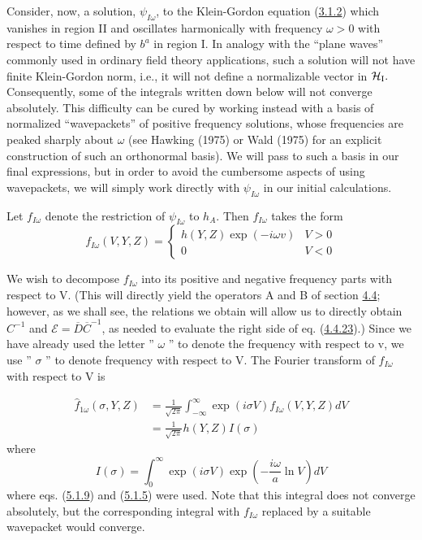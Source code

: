 \documentclass[11pt,a4paper]{article}
\begin{document}
Consider, now, a solution, \(\psi_{I\omega}\), to the Klein-Gordon equation (\hyperref[eq:3.1.2]{3.1.2}) which vanishes in region II and oscillates harmonically with frequency \(\omega>0\) with respect to time defined by \(b^a\) in region I. In analogy with the ``plane waves'' commonly used in ordinary field theory applications, such a solution will not have finite Klein-Gordon norm, i.e., it will not define a normalizable vector in \(\mathcal{H}_{\rm I}.\) Consequently, some of the integrals written down below will not converge absolutely. This difficulty can be cured by working instead with a basis of normalized ``wavepackets'' of positive frequency solutions, whose frequencies are peaked sharply about \(\omega\) (see Hawking (1975) or Wald (1975) for an explicit construction of such an orthonormal basis). We will pass to such a basis in our final expressions, but in order to avoid the cumbersome aspects of using wavepackets, we will simply work directly with \(\psi_{I\omega}\) in our initial calculations.

Let \(f_{I\omega}\) denote the restriction of \(\psi_{I\omega}\) to \(h_A.\) Then \(f_{I\omega}\) takes the form
\begin{equation*}
f_{I\omega} (V,Y,Z) = \left\{ \begin{array}{cc} h(Y,Z) \exp(-i\omega v) & V>0 \\ 0 & V<0 \end{array} \right. \tag{5.1.9}\label{eq:5.1.9}
\end{equation*}

We wish to decompose \(f_{I\omega}\) into its positive and negative frequency parts with respect to V. (This will directly yield the operators A and B of section \hyperlink{sec:4.4}{4.4}; however, as we shall see, the relations we obtain will allow us to directly obtain \(C^{-1}\) and \(\mathcal{E} = \overline{D} \overline{C}^{-1}\), as needed to evaluate the right side of eq. (\hyperref[eq:4.4.23]{4.4.23}).) Since we have already used the letter '' \(\omega\) '' to denote the frequency with respect to v, we use '' \(\sigma\) '' to denote frequency with respect to V. The Fourier transform of \(f_{I\omega}\) with respect to V is

\hypertarget{source-125}{}
\begin{equation*}
\begin{aligned}\hat{f}_{1\omega}(\sigma,Y,Z) &= \frac{1}{\sqrt{2\pi}} \int_{-\infty}^{\infty} \exp(i\sigma V) f_{I\omega}(V,Y,Z) dV\\&=\frac{1}{\sqrt{2\pi}} h(Y,Z) I(\sigma)\end{aligned} \tag{5.1.10}\label{eq:5.1.10}
\end{equation*}
where
\begin{equation*}
I(\sigma) = \int_0^{\infty} \exp(i\sigma V) \exp\left(-\frac{i\omega}{a} \ln V\right) dV \tag{5.1.11}\label{eq:5.1.11}
\end{equation*}
where eqs. (\hyperref[eq:5.1.9]{5.1.9}) and (\hyperref[eq:5.1.5]{5.1.5}) were used. Note that this integral does not converge absolutely, but the corresponding integral with \(f_{I\omega}\) replaced by a suitable wavepacket would converge.
\end{document}
